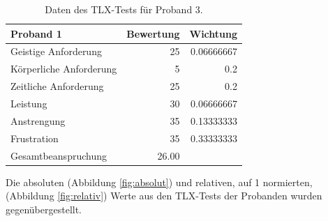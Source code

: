 \begin{table}[htb]
    \caption{\label{tab:tlx-proband3}Daten des TLX-Tests für Proband 3.}
    \centering
    \begin{tabular}{l r r}
        Proband 1 & Bewertung & Wichtung \\
        \hline
        Geistige Anforderung & 25 & 0.06666667 \\
        Körperliche Anforderung & 5 & 0.2 \\
        Zeitliche Anforderung & 25 & 0.2 \\
        Leistung & 30 & 0.06666667 \\
        Anstrengung & 35 & 0.13333333 \\
        Frustration & 35 & 0.33333333 \\
        \hline
        Gesamtbeanspruchung & 26.00 & \\
    \end{tabular}
\end{table}

Die absoluten (Abbildung \ref{fig:absolut}) und relativen, auf 1 normierten, (Abbildung \ref{fig:relativ}) Werte aus den TLX-Tests der Probanden wurden gegenübergestellt.

\begin{figure}[htb]
    \centering

\end{figure}
